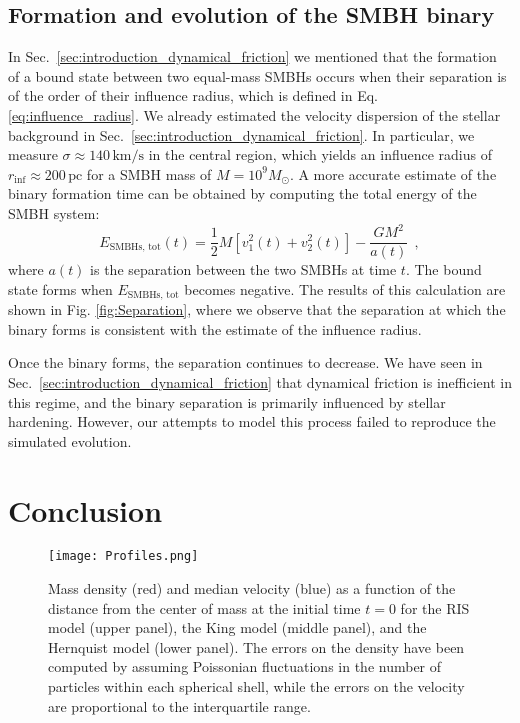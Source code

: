 \documentclass[fleqn,usenatbib]{mnras}
\begin{document}
\subsection{Formation and evolution of the SMBH binary}\label{sec:analysis_binary}
In Sec.~\ref{sec:introduction_dynamical_friction} we mentioned that the formation of a bound state between two equal-mass SMBHs occurs when their separation is of the order of their influence radius, which is defined in Eq. \ref{eq:influence_radius}.
We already estimated the velocity dispersion of the stellar background in Sec.~\ref{sec:introduction_dynamical_friction}.
In particular, we measure $\sigma \approx 140 \,\text{km/s}$ in the central region, which yields an influence radius of $r_\text{inf} \approx 200 \,\text{pc}$ for a SMBH mass of $M=10^9 M_\odot$.
A more accurate estimate of the binary formation time can be obtained by computing the total energy of the SMBH system:
\begin{equation}
    E_\text{SMBHs, tot}(t) = \dfrac{1}{2} M \left[v_1^2(t) + v_2^2(t)\right] - \dfrac{GM^2}{a(t)} \:\: ,
    \label{eq:total_energy_SMBHs}
\end{equation}
where $a(t)$ is the separation between the two SMBHs at time $t$.
The bound state forms when $E_\text{SMBHs, tot}$ becomes negative.
The results of this calculation are shown in Fig. \ref{fig:Separation}, where we observe that the separation at which the binary forms is consistent with the estimate of the influence radius.
\vspace{0.5em}

Once the binary forms, the separation continues to decrease.
We have seen in Sec.~\ref{sec:introduction_dynamical_friction} that dynamical friction is inefficient in this regime, and the binary separation is primarily influenced by stellar hardening.
However, our attempts to model this process failed to reproduce the simulated evolution.



\section{Conclusion}\label{sec:conclusion}


\begin{figure}\centering
	\texttt{[image: Profiles.png]}
    \caption{Mass density (red) and median velocity (blue) as a function of the distance from the center of mass at the initial time $t=0$ for the RIS model (upper panel), the King model (middle panel), and the Hernquist model (lower panel). The errors on the density have been computed by assuming Poissonian fluctuations in the number of particles within each spherical shell, while the errors on the velocity are proportional to the interquartile range.}
    \label{fig:profiles}
\end{figure}
\end{document}
